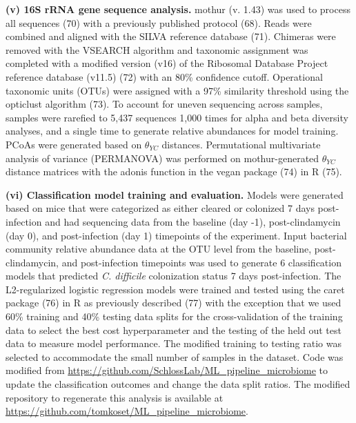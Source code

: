 \documentclass[
  11pt,
]{article}
\begin{document}
\textbf{(v) 16S rRNA gene sequence analysis.} mothur (v. 1.43) was used
to process all sequences (70) with a previously published protocol (68).
Reads were combined and aligned with the SILVA reference database (71).
Chimeras were removed with the VSEARCH algorithm and taxonomic
assignment was completed with a modified version (v16) of the Ribosomal
Database Project reference database (v11.5) (72) with an 80\% confidence
cutoff. Operational taxonomic units (OTUs) were assigned with a 97\%
similarity threshold using the opticlust algorithm (73). To account for
uneven sequencing across samples, samples were rarefied to 5,437
sequences 1,000 times for alpha and beta diversity analyses, and a
single time to generate relative abundances for model training. PCoAs
were generated based on \(\theta_{YC}\) distances. Permutational
multivariate analysis of variance (PERMANOVA) was performed on
mothur-generated \(\theta_{YC}\) distance matrices with the adonis
function in the vegan package (74) in R (75).

\textbf{(vi) Classification model training and evaluation.} Models were
generated based on mice that were categorized as either cleared or
colonized 7 days post-infection and had sequencing data from the
baseline (day -1), post-clindamycin (day 0), and post-infection (day 1)
timepoints of the experiment. Input bacterial community relative
abundance data at the OTU level from the baseline, post-clindamycin, and
post-infection timepoints was used to generate 6 classification models
that predicted \emph{C. difficile} colonization status 7 days
post-infection. The L2-regularized logistic regression models were
trained and tested using the caret package (76) in R as previously
described (77) with the exception that we used 60\% training and 40\%
testing data splits for the cross-validation of the training data to
select the best cost hyperparameter and the testing of the held out test
data to measure model performance. The modified training to testing
ratio was selected to accommodate the small number of samples in the
dataset. Code was modified from
\url{https://github.com/SchlossLab/ML_pipeline_microbiome} to update the
classification outcomes and change the data split ratios. The modified
repository to regenerate this analysis is available at
\url{https://github.com/tomkoset/ML_pipeline_microbiome}.
\end{document}
